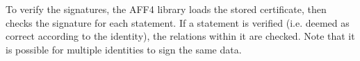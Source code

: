 \documentclass[10pt, conference]{IEEEtran}
\begin{document}
To verify the signatures, the AFF4 library loads the stored
certificate, then checks the signature for each statement. If a
statement is verified (i.e. deemed as correct according to the
identity), the relations within it are checked. Note that it is possible
for multiple identities to sign the same data.







\end{document}
